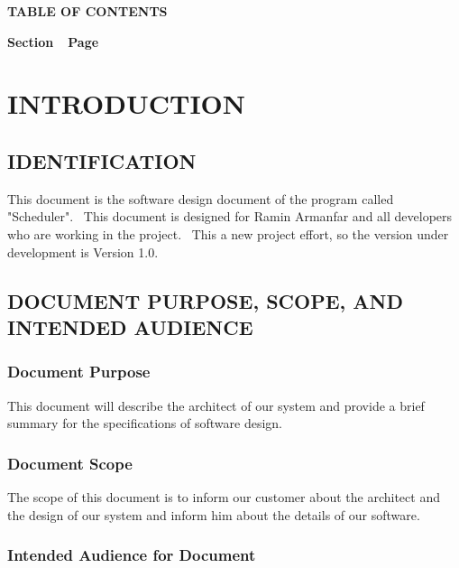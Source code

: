 \documentclass[twoside,letterpaper]{article}
\begin{document}

{\centering{}\bfseries\color{black}
TABLE OF CONTENTS
\par}

{\bfseries\color{black}
Section\ \ Page}

\setcounter{tocdepth}{9}
\renewcommand\contentsname{}
\tableofcontents

\bigskip

\bigskip
\clearpage\setcounter{page}{1}\pagestyle{Standard}
\section{INTRODUCTION}
\label{sec:intro}

\subsection{IDENTIFICATION}

This document is the software design document of the program called "Scheduler". \ This document is designed for Ramin Armanfar and all developers who are working in the project. \  This a new project effort, so the version under development is Version 1.0.

\subsection{DOCUMENT PURPOSE, SCOPE, AND INTENDED AUDIENCE}

\subsubsection{Document Purpose}

This document will describe the architect of our system and provide a brief summary for the specifications of software design.

\subsubsection{Document Scope}
The scope of this document is to inform our customer about the architect and the design of our system and inform him about the details of our software.

\subsubsection{Intended Audience for Document}
\end{document}
